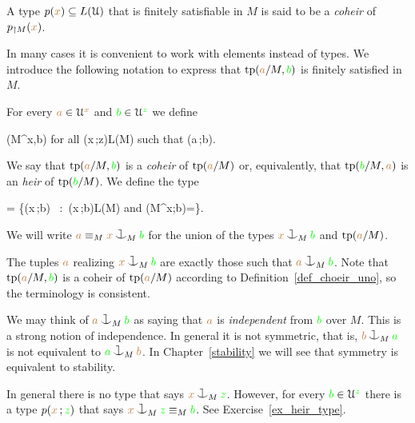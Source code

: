 \begin{definition}\label{def_choeir_uno}
  A type $p({\color{brown} x}) \subseteq L(\EuScript U)$ that is finitely satisfiable in $M$ is said to be a \emph{coheir\/} of $p_{\restriction M}({\color{brown} x})$.
\end{definition}

In many cases it is convenient to work with elements instead of types.
We introduce the following notation to express that ${\rm tp}({\color{brown} a}/M,{\color{green} b})$ is finitely satisfied in $M$.

\begin{definition}\label{def_coheir_idepencence}
  For every ${\color{brown} a}\in\EuScript U^{\color{brown} x}$ and ${\color{green} b}\in\EuScript U^{\color{green} z}$ we define

  \noindent\llap{\textcolor{red}{\Large\warning}\kern1.5ex}
  {\IFF}
  {\phi(M^{\mr x},{\gr b})\neq\varnothing
  \textrm{ for all }\phi({\mr x}\,;{\gr z})\in L(M) 
  \textrm{ such that }\phi({\mr a}\,;{\gr b})}.

  We say that ${\rm tp}({\color{brown} a}/M,{\color{green} b})$ is a \emph{coheir} of ${\rm tp}({\color{brown} a}/M)$ or, equivalently, that ${\rm tp}({\color{green} b}/M,{\color{brown} a})$ is an \emph{heir} of ${\rm tp}({\color{green} b}/M)$.
  We define the type

  {=}
  {\Big\{\neg\phi({\mr x}\,;{\gr b})
  \ :\ 
  \phi({\mr x}\,;{\gr b})\in L(M)
  \textrm{ and } \phi(M^{\mr x};{\gr b})=\varnothing\Big\}.}

  We will write \emph{${\mr a}\equiv_M{\mr x}\cnonfork_M{\gr b}$} for the union of the types ${\mr x}\cnonfork_M{\gr b}$ and ${\rm tp}({\color{brown} a}/M)$.
\end{definition}

The tuples ${\color{brown} a}$ realizing ${\mr x}\cnonfork_M{\gr b}$ are exactly those such that ${\mr a}\cnonfork_M{\gr b}$.
Note that ${\rm tp}({\color{brown} a}/M,{\color{green} b})$ is a coheir of ${\rm tp}({\color{brown} a}/M)$ according to Definition~\ref{def_choeir_uno}, so the terminology is consistent.

We may think of ${\mr a}\cnonfork_M{\gr b}$ as saying that 
${\color{brown} a}$ is \emph{independent\/} from ${\color{green} b}$ over $M$.
This is a strong notion of independence.
In general it is not symmetric, that is, ${\mr b}\cnonfork_M{\gr a}$ is not equivalent to ${\gr a}\cnonfork_M{\mr b}$. In Chapter~\ref{stability} we will see that symmetry is equivalent to stability.

\begin{remark}
  In general there is no type that says ${\mr x}\cnonfork_M{\gr z}$.
  However, for every ${\color{green} b}\in\EuScript U^{\color{green} z}$ there is a type $p({\color{brown} x}\,;{\color{green} z})$ that says ${\mr x}\cnonfork_M{\gr z}\equiv_M{\gr b}$.
  See Exercise~\ref{ex_heir_type}.
\end{remark}

